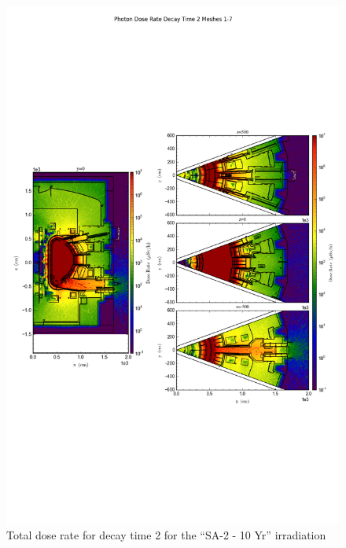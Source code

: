 \documentclass[12pt]{article}
\begin{document}
\begin{figure}[ht!]
\centering
\includegraphics[trim={0cm 8cm, 0cm 8cm},clip,scale=0.75]{../plots/final_model_with_b4c/5year/Photon_Dose_Rate_Decay_Time_2_Meshes_1-7.png}
\caption{Total dose rate for decay time 2 for the ``SA-2 - 10 Yr'' irradiation}
\label{fig:photons_5y_dc2_b4c_dose}
\end{figure}
\end{document}
